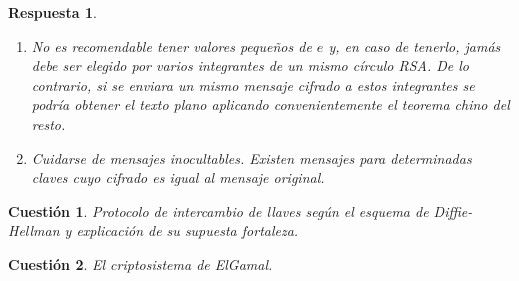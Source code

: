 \documentclass[
  a4paper,
  spanish,
  12pt,
]{scrartcl}
\theoremstyle{ejercicio-style}
\newtheorem{ejer}{Cuestión}
\theoremstyle{remark-style}
\newtheorem*{sol}{Respuesta}
\theoremstyle{teorema-style}
\begin{document}
\begin{sol}
\begin{enumerate}
    \item No es recomendable tener valores pequeños de $e$ y, en caso de tenerlo, jamás debe ser elegido por varios integrantes de un mismo círculo RSA. De lo contrario, si se enviara un mismo mensaje cifrado a estos integrantes se podría obtener el texto plano aplicando convenientemente el \textit{teorema chino del resto}.
    \item Cuidarse de mensajes inocultables. Existen mensajes para determinadas claves cuyo cifrado es igual al mensaje original.
  \end{enumerate}
\end{sol}

\begin{ejer}
  Protocolo de intercambio de llaves según el esquema de Diffie-Hellman y explicación de su supuesta fortaleza.
\end{ejer}

\begin{ejer}
  El criptosistema de ElGamal.
\end{ejer}
\end{document}
